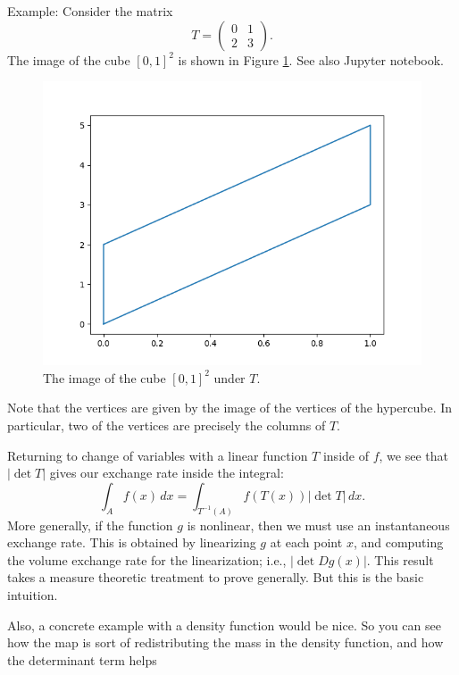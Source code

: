\documentclass{book}
\newcommand{\dx}{\, dx}
\begin{document}
\vspace{1em}
Example: Consider the matrix
$$
T = 
\begin{pmatrix}
0 & 1\\
2 & 3
\end{pmatrix}. 
$$
The image of the cube $[0,1]^2$ is shown in Figure \ref{fig:parallelepiped-2d}. See also Jupyter notebook. 
\begin{figure}[h] \label{fig:parallelepiped-2d}
\centering
\includegraphics[scale = .5]{change_of_variables/parallelepiped-2d.png}
\caption{The image of the cube $[0,1]^2$ under $T$.}
\end{figure}

Note that the vertices are given by the image of the vertices of the hypercube. In particular, two of the vertices are precisely the columns of $T$. 

Returning to change of variables with a linear function $T$ inside of $f$, we see that $|\det T|$ gives our exchange rate inside the integral:
$$
\int_A f(x)\dx = \int_{T^{-1}(A)} f(T(x)) |\det T| \dx.
$$
More generally, if the function $g$ is nonlinear, then we must use an instantaneous exchange rate. This is obtained by linearizing $g$ at each point $x$, and computing the volume exchange rate for the linearization; i.e., $|\det Dg(x)|$. 
This result takes a measure theoretic treatment to prove generally. But this is the basic intuition. 

Also, a concrete example with a density function would be nice. So you can see how the map is sort of redistributing the mass in the density function, and how the determinant term helps 
\end{document}
